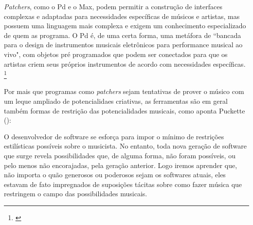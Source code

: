 {\emph{Patchers}, como o Pd e o Max, podem permitir a construção de interfaces complexas e adaptadas para necessidades específicas de músicos e artistas, mas possuem uma linguagem mais complexa e exigem um conhecimento especializado de quem as programa. O Pd é, de uma certa forma, uma metáfora de ``bancada para o design de instrumentos musicais eletrônicos para performance musical ao vivo", com objetos pré programados que podem ser conectados para que os artistas criem seus próprios instrumentos de acordo com necessidades específicas. \footnote{\cite{PucketteMiller}}
 
Por mais que programas como \emph{patchers} sejam tentativas de prover o músico com um leque ampliado de potencialidaes criativas, as ferramentas  são em geral também formas de restrição das potencialidades musicais, como aponta Puckette (\citeyear{PucketteMiller}):

\begin{citacao}
 O desenvolvedor de software se esforça para impor o mínimo de restrições estilísticas possíveis sobre o musicista. No entanto, toda nova geração de software que surge revela possibilidades que, de alguma forma, não foram possíveis, ou pelo menos não encorajadas, pela geração anterior. Logo iremos aprender que, não importa o quão generosos ou poderosos sejam os softwares atuais, eles estavam de fato impregnados de suposições tácitas sobre como fazer música que restringem o campo das possibilidades musicais.

\end{citacao}


}
